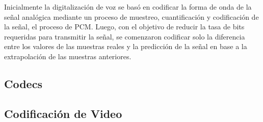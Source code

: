 		
Inicialmente la digitalización de voz se basó en codificar la forma 
de onda de la señal analógica mediante un proceso de muestreo, 
cuantificación y codificación de la señal, el proceso de PCM. Luego, con el objetivo de reducir la tasa de bits requeridas para transmitir la señal, se comenzaron codificar solo la diferencia entre los valores de las muestras reales y la predicción de la señal en base a la extrapolación de las muestras anteriores. 

\subsection{Codecs}

\subsection{Codificación de Video}

	